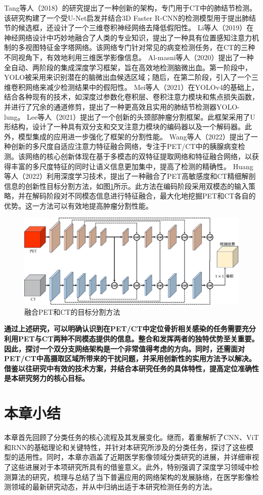 Tang等人\cite{tang2018automated}（2018）的研究提出了一种创新的架构，专门用于CT中的肺结节检测。该研究构建了一个受U-Net启发并结合3D Faster R-CNN的检测模型用于提出肺结节的候选框，还设计了一个三维卷积神经网络去降低假阳性。
Li等人\cite{li2019mvp}（2019）在神经网络设计中巧妙地融合了人类的专业知识，提出了一种具有位置感知注意力机制的多视图特征金字塔网络。该网络专门针对常见的病变检测任务，在CT的三种不同视角下，有效地利用三维医学影像信息。
Al-masni等人\cite{al2020two}（2020）提出了一种全自动、两阶段的集成深度学习框架，旨在高效地检测脑微出血。第一阶段中，YOLO被采用来识别潜在的脑微出血候选区域；随后，在第二阶段，引入了一个三维卷积网络来减少检测结果中的假阳性。
Mei等人\cite{mei2021yolo}（2021）在YOLOv4的基础上，结合各种现有的技术，如深度过参数化卷积层、卷积注意力模块和焦点损失函数，并进行了冗余的通道修剪，提出了一种更高效且实用的肺结节检测器YOLO-lung。
Lee等人\cite{lee2021dual}（2021）提出了一个创新的头颈部肿瘤分割框架。此框架采用了U形结构，设计了一种具有双分支和交叉注意力模块的编码器以及一个解码器。此外，模型集成的应用进一步强化了框架的分割性能。
Wang等人\cite{wang2022maff}（2022）提出了一种创新的多尺度自适应注意力特征融合网络，专注于PET/CT中的胰腺病变检测。该网络的核心创新体现在基于多模态的双特征提取网络和特征融合网络，以获得丰富的多尺度特征的同时让语义信息更加集中，提高了检测的精确性。
Huang等人\cite{huang2022isa}（2022）利用深度学习技术，提出了一种融合了PET高敏感度和CT精细解剖信息的创新性目标分割方法，如图\ref{fig:chap02_isanet}所示。此方法在编码阶段采用双模态的输入策略，并在解码阶段对不同模态信息进行特征融合，最大化地挖掘PET和CT各自的优势。这一方法可以有效地提高肿瘤分割性能。

\begin{figure}[htbp]
  \centering
  \includegraphics[width=\textwidth]{figures/chap02_isanet.jpg}
  \caption{融合PET和CT的目标分割方法}
  \label{fig:chap02_isanet}
\end{figure}

\textbf{通过上述研究，可以明确认识到在PET/CT中定位骨折相关感染的任务需要充分利用PET与CT两种不同模态提供的信息。整合和发挥两者的独特优势至关重要。因此，探讨一个双分支网络架构是一个非常值得考虑的方向。同时，还需面对PET/CT中高摄取区域所带来的干扰问题，并采用创新性的实用方法予以解决。借鉴以往研究中有效的技术方案，并结合本研究任务的具体特性，提高定位准确性是本研究努力的核心目标。}

\section{本章小结}

本章首先回顾了分类任务的核心流程及其发展变化。继而，着重解析了CNN、ViT和RNN的基础理论和关键特性，并针对本研究所涉及的分类任务，探讨了这些模型的适用性。同时，本章亦涵盖了近期医学影像领域分类研究的进展，并详细审视了这些进展对于本项研究所具有的借鉴意义。此外，特别强调了深度学习领域中检测算法的研究，梳理与总结了当下普遍应用的网络架构的发展脉络，在医学影像检测领域的最新研究动态，并从中归纳出适于本研究检测任务的方法。